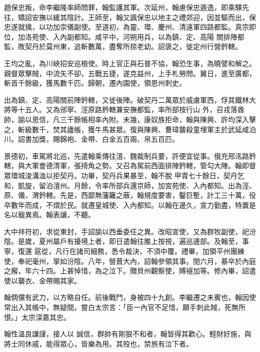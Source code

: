 \begin{pinyinscope}
 趙保忠叛，命李繼隆率師問罪，翰監護其軍。次延州，翰慮保忠遁逸，即乘驛先往，矯詔安撫以緩其陰計。王師至，翰又諷保忠以地主之禮郊迎，因並驅而出，保忠遂就擒，以功加崇儀副使。至道初，為靈、環、慶州、清遠軍四路都監。真宗即位，加洛苑使、入內副都知。咸平中，河朔用兵，以為鎮、定、高陽
 關排陣都監，敗契丹於莫州東，追斬數萬，盡奪所掠老幼。詔褒之，徙定州行營鈐轄。



 王均之亂，為川峽招安巡檢使。時上官正與石普不協，翰恐生事，為曉譬和解之。親督眾擊賊，中流矢不卻，五戰五捷，遂克益州，上手札勞問。翼日，進至廣都，斬首千餘級，獲馬數千匹。歸朝，遷內園使，領恩州刺史。



 出為鎮、定、高陽關前陣鈐轄，又徙後陣。破契丹二萬眾於威虜軍西，俘其鐵林大將等十五人。又為邠寧、涇原路鈐轄兼安撫都監，率所部按行山
 外，召戎落酋帥，諭以恩信，凡三千餘帳相率內附。未幾，康奴族拒命，翰與陳興、許均深入擊之，斬級數千，焚其廬帳，獲牛馬甚眾。復與陳興、曹瑋襲殺童埋軍主於武延咸泊川。詔書加獎，賜錦袍、金帶、白金五百兩、帛五百匹。



 景德初，車駕將北巡，先遣翰乘傳往澶、魏裁制兵要，許便宜從事。俄充邢洺路鈐轄，與大軍會德清軍，張掎角之勢。又召為駕前西面排陣鈐轄，管勾大陣。翰即督眾環城浚溝洫以拒契丹。功畢，契丹兵果暴至，翰不脫
 甲胄七十餘日，契丹乞和，凱旋，留泊澶州。月餘，令率所部兵還京師，加宮苑使、入內都知。出為涇、原、儀、渭鈐轄。先是，西鄙無藩籬之蔽，翰規度要害，鑿巨塹，計工三十萬，役卒數年而成，不煩於民。就遷皇城使、入內都知。以翰在邊久，宣力勤盡，特置是名以寵異焉。翰表讓，不聽。



 大中祥符初，求從東封，手詔諭以西垂委任之異。改昭宣使，又為群牧副使，祀汾陰。是歲，夏州屬戶有擾境上者，即日遣翰往脽上按視，遍巡邊部。及翰至，事寧，復還
 扈從，凡行在諸司細務，悉令裁決，不須中覆。禮畢，加領平州團練使，奉祀毫州，掌如汾陰。八年，營葺大內，詔翰參領其事。閏六月，暴卒於內庭之廨，年六十四。上甚悼惜，為之泣下。贈貝州觀察使，賻襚加等。修內畢，詔遣使以襲衣、金帶賜其家。



 翰倜儻有武力，以方略自任。前後戰鬥，身被四十九創。李繼遷之未賓也，翰因使常出入其帳中，無疑間，嘗白太宗言：「臣一內官不足惜，願手刺此賊，死無所恨。」太宗深嘉其忠。



 翰性溫良謙謹，接人以
 誠信，群帥有剛狠不和者，翰皆得其歡心。輕財好施，與將士同休戚，能得眾心，皆樂為用。其歿也，禁旅有泣下者。




\end{pinyinscope}
